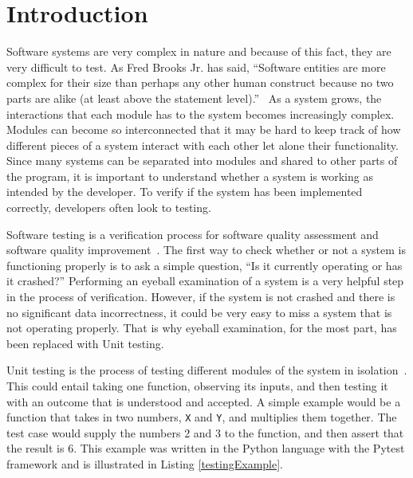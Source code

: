%
%

\chapter{Introduction}\label{ch:intro} %
Software systems are very complex in nature and because of this fact, they are very difficult to test. As Fred Brooks Jr. has said, ``Software entities are more complex for their size than perhaps any other human construct because no two parts are alike (at least above the statement level).''~\cite{brooks1987no} As a system grows, the interactions that each module has to the system becomes increasingly complex. Modules can become so interconnected that it may be hard to keep track of how different pieces of a system interact with each other let alone their functionality. Since many systems can be separated into modules and shared to other parts of the program, it is important to understand whether a system is working as intended by the  developer. To verify if the system has been implemented correctly, developers often look to testing.

Software testing is a verification process for software quality assessment and software quality improvement~\cite{friedman_voas_1995}. The first way to check whether or not a system is functioning properly is to ask a simple question, ``Is it currently operating or has it crashed?'' Performing an eyeball examination of a system is a very helpful step in the process of verification. However, if the system is not crashed and there is no significant data incorrectness, it could be very easy to miss a system that is not operating properly. That is why eyeball examination, for the most part, has been replaced with Unit testing.

Unit testing is the process of testing different modules of the system in isolation~\cite{friedman_voas_1995}. This could entail taking one function, observing its inputs, and then testing it with an outcome that is understood and accepted. A simple example would be a function that takes in two numbers, \texttt{X} and \texttt{Y}, and multiplies them together. The test case would supply the numbers 2 and 3 to the function, and then assert that the result is 6. This example was written in the Python language with the Pytest framework and is illustrated in Listing \ref{testingExample}.


